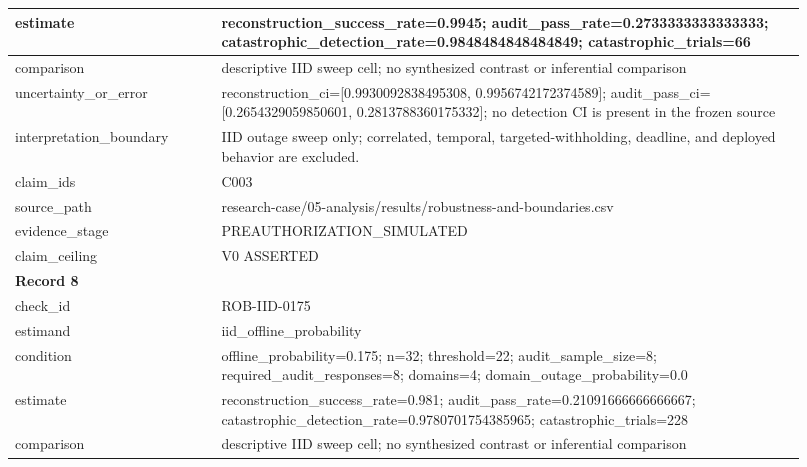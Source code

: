\begin{longtable}{|p{0.24\linewidth}|p{0.68\linewidth}|}
estimate & reconstruction\_\allowbreak{}success\_\allowbreak{}rate=0.9945;\allowbreak{} audit\_\allowbreak{}pass\_\allowbreak{}rate=0.2733333333333333;\allowbreak{} catastrophic\_\allowbreak{}detection\_\allowbreak{}rate=0.9848484848484849;\allowbreak{} catastrophic\_\allowbreak{}trials=66 \\ \hline
comparison & descriptive IID sweep cell;\allowbreak{} no synthesized contrast or inferential comparison \\ \hline
uncertainty\_\allowbreak{}or\_\allowbreak{}error & reconstruction\_\allowbreak{}ci=[0.9930092838495308, 0.9956742172374589];\allowbreak{} audit\_\allowbreak{}pass\_\allowbreak{}ci=[0.2654329059850601, 0.2813788360175332];\allowbreak{} no detection CI is present in the frozen source \\ \hline
interpretation\_\allowbreak{}boundary & IID outage sweep only;\allowbreak{} correlated, temporal, targeted-withholding, deadline, and deployed behavior are excluded. \\ \hline
claim\_\allowbreak{}ids & C003 \\ \hline
source\_\allowbreak{}path & research-case/05-analysis/results/robustness-and-boundaries.csv \\ \hline
evidence\_\allowbreak{}stage & PREAUTHORIZATION\_\allowbreak{}SIMULATED \\ \hline
claim\_\allowbreak{}ceiling & V0 ASSERTED \\ \hline
\multicolumn{2}{|l|}{\textbf{Record 8}} \\ \hline
check\_\allowbreak{}id & ROB-IID-0175 \\ \hline
estimand & iid\_\allowbreak{}offline\_\allowbreak{}probability \\ \hline
condition & offline\_\allowbreak{}probability=0.175;\allowbreak{} n=32;\allowbreak{} threshold=22;\allowbreak{} audit\_\allowbreak{}sample\_\allowbreak{}size=8;\allowbreak{} required\_\allowbreak{}audit\_\allowbreak{}responses=8;\allowbreak{} domains=4;\allowbreak{} domain\_\allowbreak{}outage\_\allowbreak{}probability=0.0 \\ \hline
estimate & reconstruction\_\allowbreak{}success\_\allowbreak{}rate=0.981;\allowbreak{} audit\_\allowbreak{}pass\_\allowbreak{}rate=0.21091666666666667;\allowbreak{} catastrophic\_\allowbreak{}detection\_\allowbreak{}rate=0.9780701754385965;\allowbreak{} catastrophic\_\allowbreak{}trials=228 \\ \hline
comparison & descriptive IID sweep cell;\allowbreak{} no synthesized contrast or inferential comparison \\ \hline

\end{longtable}
